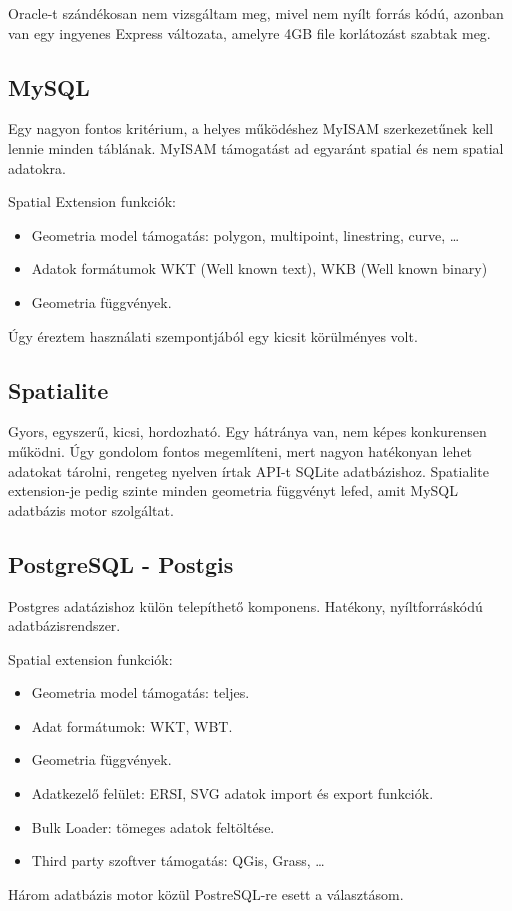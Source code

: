 	Oracle-t szándékosan nem vizsgáltam meg, mivel nem nyílt forrás kódú, azonban van egy ingyenes Express változata, amelyre 4GB file korlátozást szabtak meg.
	
		\subsection{MySQL} %
		\label{sub:mysql}
		Egy nagyon fontos kritérium, a helyes működéshez MyISAM szerkezetűnek kell lennie minden táblának. MyISAM támogatást ad egyaránt spatial és nem spatial adatokra.
		
		Spatial Extension funkciók:
		\begin{itemize}
			\item Geometria model támogatás: polygon, multipoint, linestring, curve, \ldots
			\item Adatok formátumok WKT (Well known text), WKB (Well known binary)
			\item Geometria függvények.
		\end{itemize}
		Úgy éreztem használati szempontjából egy kicsit körülményes volt.

		\subsection{Spatialite} %
		\label{sub:spatialite}
		Gyors, egyszerű, kicsi, hordozható. Egy hátránya van, nem képes konkurensen működni. Úgy gondolom fontos megemlíteni, mert
		nagyon hatékonyan lehet adatokat tárolni, rengeteg nyelven írtak API-t SQLite adatbázishoz. Spatialite extension-je pedig szinte minden
		geometria függvényt lefed, amit MySQL adatbázis motor szolgáltat.
		
		\subsection{PostgreSQL - Postgis} %
		\label{sub:postgresql}
		Postgres adatázishoz külön telepíthető komponens. Hatékony, nyíltforráskódú adatbázisrendszer.
		
		Spatial extension funkciók:
		\begin{itemize}
			\item Geometria model támogatás: teljes.
			\item Adat formátumok: WKT, WBT.
			\item Geometria függvények.
			\item Adatkezelő felület: ERSI, SVG adatok import és export funkciók.
			\item Bulk Loader: tömeges adatok feltöltése.
			\item Third party szoftver támogatás: QGis, Grass, \ldots
		\end{itemize}
		Három adatbázis motor közül PostreSQL-re esett a választásom.
		
